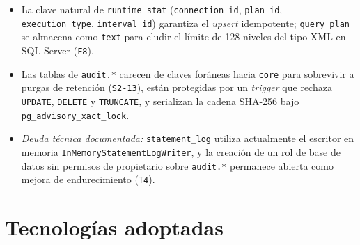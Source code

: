 \documentclass[12pt,a4paper]{article}
\begin{document}
\begin{itemize}[leftmargin=1.5em]
    \item La clave natural de \texttt{runtime\_stat} (\texttt{connection\_id}, \texttt{plan\_id}, \texttt{execution\_type}, \texttt{interval\_id}) garantiza el \textit{upsert} idempotente; \texttt{query\_plan} se almacena como \texttt{text} para eludir el límite de 128 niveles del tipo XML en SQL Server (\texttt{F8}).
    \item Las tablas de \texttt{audit.*} carecen de claves foráneas hacia \texttt{core} para sobrevivir a purgas de retención (\texttt{S2-13}), están protegidas por un \textit{trigger} que rechaza \texttt{UPDATE}, \texttt{DELETE} y \texttt{TRUNCATE}, y serializan la cadena SHA-256 bajo \texttt{pg\_advisory\_xact\_lock}.
    \item \textit{Deuda técnica documentada:} \texttt{statement\_log} utiliza actualmente el escritor en memoria \texttt{InMemoryStatementLogWriter}, y la creación de un rol de base de datos sin permisos de propietario sobre \texttt{audit.*} permanece abierta como mejora de endurecimiento (\texttt{T4}).
\end{itemize}

\section{Tecnologías adoptadas}
\end{document}
